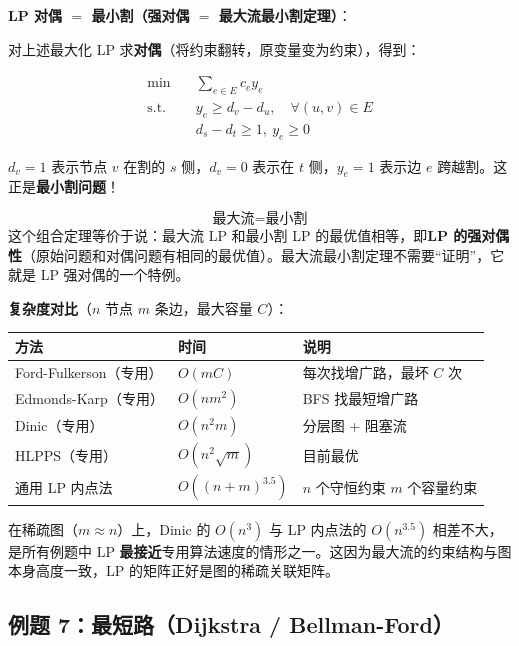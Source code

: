 \documentclass[12pt, a4paper]{ctexart}
\begin{document}
\begin{blackboard}
\textbf{LP 对偶 $=$ 最小割（强对偶 $=$ 最大流最小割定理）}：

对上述最大化 LP 求\textbf{对偶}（将约束翻转，原变量变为约束），得到：

\begin{align}
\min \quad & \sum_{e \in E} c_e y_e \\
\text{s.t.} \quad & y_e \geq d_v - d_u, \quad \forall (u,v) \in E \\
& d_s - d_t \geq 1,\ y_e \geq 0
\end{align}

$d_v = 1$ 表示节点 $v$ 在割的 $s$ 侧，$d_v = 0$ 表示在 $t$ 侧，$y_e = 1$ 表示边 $e$ 跨越割。这正是\textbf{最小割问题}！

\begin{keypoint}[最大流最小割 $=$ LP 强对偶]
$$\text{最大流} = \text{最小割}$$
这个组合定理等价于说：最大流 LP 和最小割 LP 的最优值相等，即\textbf{LP 的强对偶性}（原始问题和对偶问题有相同的最优值）。最大流最小割定理不需要``证明''，它就是 LP 强对偶的一个特例。
\end{keypoint}

\textbf{复杂度对比}（$n$ 节点 $m$ 条边，最大容量 $C$）：

\begin{center}
\begin{tabular}{lll}
\toprule
方法 & 时间 & 说明 \\
\midrule
Ford-Fulkerson（专用） & $O(mC)$ & 每次找增广路，最坏 $C$ 次 \\
Edmonds-Karp（专用） & $O(nm^2)$ & BFS 找最短增广路 \\
Dinic（专用） & $O(n^2 m)$ & 分层图 + 阻塞流 \\
HLPPS（专用） & $O(n^2 \sqrt{m})$ & 目前最优 \\
通用 LP 内点法 & $O((n+m)^{3.5})$ & $n$ 个守恒约束 $m$ 个容量约束 \\
\bottomrule
\end{tabular}
\end{center}

在稀疏图（$m \approx n$）上，Dinic 的 $O(n^3)$ 与 LP 内点法的 $O(n^{3.5})$ 相差不大，是所有例题中 LP \textbf{最接近}专用算法速度的情形之一。这因为最大流的约束结构与图本身高度一致，LP 的矩阵正好是图的稀疏关联矩阵。

\end{blackboard}

\subsection{例题 7：最短路（Dijkstra / Bellman-Ford）}
\end{document}
